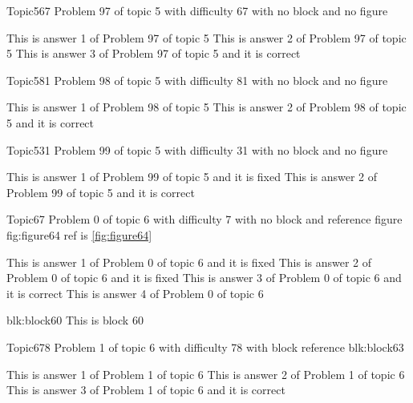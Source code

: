 \documentclass[master]{exam}
\begin{document}
\begin{problem}{Topic5}{67}
	Problem 97 of topic 5 with difficulty 67 with no block and no figure
	\begin{answers}
		\answer This is answer 1 of Problem 97 of topic 5 
		\answer This is answer 2 of Problem 97 of topic 5 
		\answer[correct] This is answer 3 of Problem 97 of topic 5 and it is correct
	\end{answers}
\end{problem}

\begin{problem}{Topic5}{81}
	Problem 98 of topic 5 with difficulty 81 with no block and no figure
	\begin{answers}
		\answer This is answer 1 of Problem 98 of topic 5 
		\answer[correct] This is answer 2 of Problem 98 of topic 5 and it is correct
	\end{answers}
\end{problem}

\begin{problem}{Topic5}{31}
	Problem 99 of topic 5 with difficulty 31 with no block and no figure
	\begin{answers}
		\answer[fixed] This is answer 1 of Problem 99 of topic 5 and it is fixed
		\answer[correct] This is answer 2 of Problem 99 of topic 5 and it is correct
	\end{answers}
\end{problem}

\begin{problem}{Topic6}{7}
	Problem 0 of topic 6 with difficulty 7 with no block and reference figure fig:figure64 ref is \ref{fig:figure64}
	\begin{answers}
		\answer[fixed] This is answer 1 of Problem 0 of topic 6 and it is fixed
		\answer[fixed] This is answer 2 of Problem 0 of topic 6 and it is fixed
		\answer[correct] This is answer 3 of Problem 0 of topic 6 and it is correct
		\answer This is answer 4 of Problem 0 of topic 6 
	\end{answers}
\end{problem}



\begin{block}{blk:block60}
This is block 60
\end{block}


\begin{problem}[requires=blk:block63]{Topic6}{78}
	Problem 1 of topic 6 with difficulty 78 with block reference blk:block63
	\begin{answers}
		\answer This is answer 1 of Problem 1 of topic 6 
		\answer This is answer 2 of Problem 1 of topic 6 
		\answer[correct] This is answer 3 of Problem 1 of topic 6 and it is correct
	\end{answers}
\end{problem}
\end{document}
